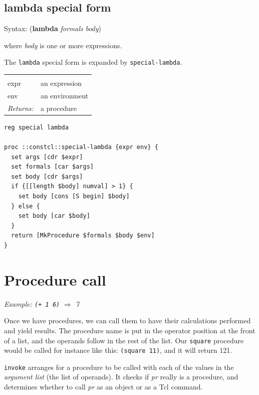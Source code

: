 \documentclass[twoside,9pt]{report}
\begin{document}
\subsection{lambda special form}
\label{lambda-special-form}


Syntax: (\textbf{lambda} \emph{formals} \emph{body})


where \emph{body} is one or more expressions.


The \texttt{lambda} special form is expanded by \texttt{special-lambda}.

\noindent\begin{tabular}{ |p{1.9cm} p{8cm}| }
\hline
\rowcolor[HTML]{CCCCCC} \multicolumn{2}{|l|}{\bf special-lambda (internal)} \\
expr & an expression \\
env & an environment \\
\textit{Returns:} & a procedure \\
\hline
\end{tabular}
\begin{lstlisting}
reg special lambda

proc ::constcl::special-lambda {expr env} {
  set args [cdr $expr]
  set formals [car $args]
  set body [cdr $args]
  if {[[length $body] numval] > 1} {
    set body [cons [S begin] $body]
  } else {
    set body [car $body]
  }
  return [MkProcedure $formals $body $env]
}
\end{lstlisting}
\section{Procedure call}
\label{procedure-call}


\emph{Example: \texttt{(+ 1 6)} $\Rightarrow$ 7}


Once we have procedures, we can call them to have their calculations performed and yield results. The procedure name is put in the operator position at the front of a list, and the operands follow in the rest of the list. Our \texttt{square} procedure would be called for instance like this: \texttt{(square 11)}, and it will return 121.


\texttt{invoke} arranges for a procedure to be called with each of the values in the \emph{argument list} (the list of operands). It checks if \emph{pr} really is a procedure, and determines whether to call \emph{pr} as an object or as a Tcl command.
\end{document}
